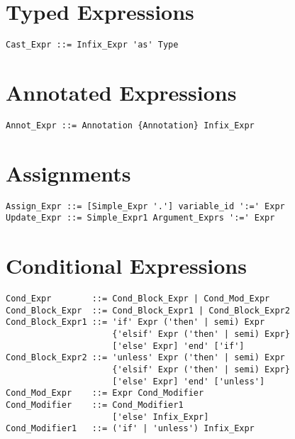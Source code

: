 \section{Typed Expressions}

\syntax\begin{lstlisting}
Cast_Expr ::= Infix_Expr 'as' Type
\end{lstlisting}







\section{Annotated Expressions}
\label{sec:annotated-exprs}

\syntax\begin{lstlisting}
Annot_Expr ::= Annotation {Annotation} Infix_Expr
\end{lstlisting}








\section{Assignments}

\syntax\begin{lstlisting}
Assign_Expr ::= [Simple_Expr '.'] variable_id ':=' Expr
Update_Expr ::= Simple_Expr1 Argument_Exprs ':=' Expr
\end{lstlisting}








\section{Conditional Expressions}

\syntax\begin{lstlisting}
Cond_Expr        ::= Cond_Block_Expr | Cond_Mod_Expr
Cond_Block_Expr  ::= Cond_Block_Expr1 | Cond_Block_Expr2
Cond_Block_Expr1 ::= 'if' Expr ('then' | semi) Expr 
                     {'elsif' Expr ('then' | semi) Expr}
                     ['else' Expr] 'end' ['if']
Cond_Block_Expr2 ::= 'unless' Expr ('then' | semi) Expr 
                     {'elsif' Expr ('then' | semi) Expr}
                     ['else' Expr] 'end' ['unless']
Cond_Mod_Expr    ::= Expr Cond_Modifier
Cond_Modifier    ::= Cond_Modifier1
                     ['else' Infix_Expr]
Cond_Modifier1   ::= ('if' | 'unless') Infix_Expr 
\end{lstlisting}








